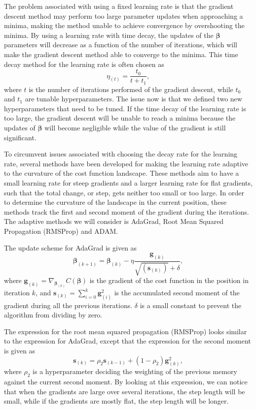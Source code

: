 \documentclass[12pt]{article}
\begin{document}
The problem associated with using a fixed learning rate is that the gradient descent method may perform too large parameter updates when approaching a minima, making the method unable to achieve convergence by overshooting the minima. By using a learning rate with time decay, the updates of the $\boldsymbol{\beta}$ parameters will decrease as a function of the number of iterations, which will make the gradient descent method able to converge to the minima. This time decay method for the learning rate is often chosen as
\begin{equation} \label{eq:time_decay}
    \eta_{(t)} = \frac{t_0}{t + t_1},
\end{equation}
where $t$ is the number of iterations performed of the gradient descent, while $t_0$ and $t_1$ are tunable hyperparameters. The issue now is that we defined two new hyperparameters that need to be tuned. If the time decay of the learning rate is too large, the gradient descent will be unable to reach a minima because the updates of $\boldsymbol{\beta}$ will become negligible while the value of the gradient is still significant.

To circumvent issues associated with choosing the decay rate for the learning rate, several methods have been developed for making the learning rate adaptive to the curvature of the cost function landscape. These methods aim to have a small learning rate for steep gradients and a larger learning rate for flat gradients, such that the total change, or step, gets neither too small or too large. In order to determine the curvature of the landscape in the current position, these methods track the first and second moment of the gradient during the iterations. The adaptive methods we will consider is AdaGrad, Root Mean Squared Propagation (RMSProp) and ADAM.

The update scheme for AdaGrad is given as
\begin{equation}
    \boldsymbol{\beta}_{(k+1)} = \boldsymbol{\beta}_{(k)} - \eta \frac{\boldsymbol{g}_{(k)}}{\sqrt{(\boldsymbol{s}_{(k)})} + \delta},
\end{equation}
where $\boldsymbol{g}_{(k)} = \nabla_{\boldsymbol{\beta}_{(k)}} C(\boldsymbol{\beta})$ is the gradient of the cost function in the position in iteration $k$, and $\boldsymbol{s}_{(k)} = \sum_{i=0}^k \boldsymbol{g}_{(i)}^2$ is the accumulated second moment of the gradient during all the previous iterations. $\delta$ is a small constant to prevent the algorithm from dividing by zero.

The expression for the root mean squared propagation (RMSProp) looks similar to the expression for AdaGrad, except that the expression for the second moment is given as
\begin{equation}\label{eq:second_moment}
    \boldsymbol{s}_{(k)} = \rho_2 \boldsymbol{s}_{(k-1)} + (1 - \rho_2) \boldsymbol{g}_{(k)}^2,
\end{equation}
where $\rho_2$ is a hyperparameter deciding the weighting of the previous memory against the current second moment. 
By looking at this expression, we can notice that when the gradients are large over several iterations, the step length will be small, while if the gradients are mostly flat, the step length will be longer.
\end{document}

